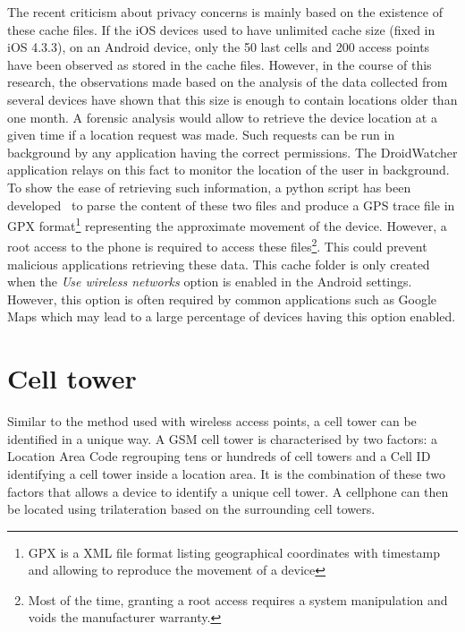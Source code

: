 The recent criticism about privacy concerns is mainly based on the existence of these cache files.
If the iOS devices used to have unlimited cache size (fixed in iOS 4.3.3), on an Android device, only the 50 last cells and 200 access points have been observed as stored in the cache files.
However, in the course of this research, the observations made based on the analysis of the data collected from several devices have shown that this size is enough to contain locations older than one month.
A forensic analysis would allow to retrieve the device location at a given time if a location request was made.
Such requests can be run in background by any application having the correct permissions.
The DroidWatcher application relays on this fact to monitor the location of the user in background.\\

To show the ease of retrieving such information, a python script has been developed~\cite{soft-locdump} to parse the content of these two files and produce a GPS trace file in GPX format\footnote{GPX is a XML file format listing geographical coordinates with timestamp and allowing to reproduce the movement of a device} representing the approximate movement of the device.
However, a root access to the phone is required to access these files\footnote{Most of the time, granting a root access requires a system manipulation and voids the manufacturer warranty.}.
This could prevent malicious applications retrieving these data.
This cache folder is only created when the \emph{Use wireless networks} option is enabled in the Android settings.
However, this option is often required by common applications such as Google Maps which may lead to a large percentage of devices having this option enabled.\\

\section{Cell tower}
\label{sec:loc-cell-tower}
Similar to the method used with wireless access points, a cell tower can be identified in a unique way.
A GSM cell tower is characterised by two factors: a Location Area Code regrouping tens or hundreds of cell towers and a Cell ID identifying a cell tower inside a location area.
It is the combination of these two factors that allows a device to identify a unique cell tower.
A cellphone can then be located using trilateration based on the surrounding cell towers.\\

